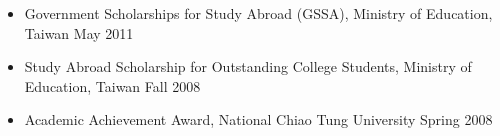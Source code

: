 \documentclass[10pt]{article}
\newenvironment{innerlist}[1][\enskip\textbullet]%
        {\begin{itemize}[#1,leftmargin=*,parsep=0pt,itemsep=0pt,topsep=0pt,partopsep=0pt]}
        {\end{itemize}}
\newcommand{\halfblankline}{\quad\vspace{-0.5\baselineskip}\pagebreak[3]}
\begin{document}
{\begin{itemize}[leftmargin=0pt,parsep=3pt,itemsep=0pt,topsep=0pt,partopsep=0pt]
\item[] Government Scholarships for Study Abroad (GSSA), Ministry of Education, Taiwan \hfill May 2011
\item[] Study Abroad Scholarship for Outstanding College Students, Ministry of Education, Taiwan \hfill Fall 2008
\item[] Academic Achievement Award, National Chiao Tung University \hfill Spring 2008
\end{itemize}
%
%
%
%

}
\end{document}
